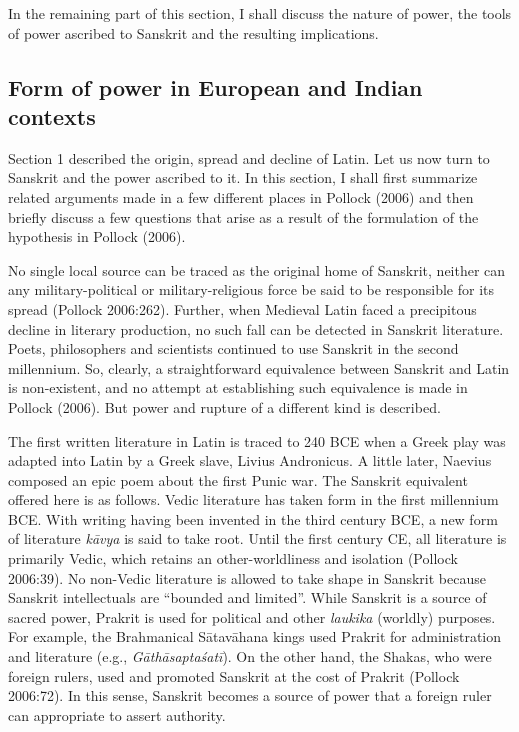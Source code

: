 In the remaining part of this section, I shall discuss the nature of power, the tools of power ascribed to Sanskrit and the resulting implications.
\newpage


\subsection{Form of power in European and Indian contexts}
\vskip -4pt

Section 1 described the origin, spread and decline of Latin. Let us now turn to Sanskrit and the power ascribed to it. In this section, I shall first summarize related arguments made in a few different places in Pollock (2006) and then briefly discuss a few questions that arise as a result of the formulation of the hypothesis in Pollock (2006). 

No single local source can be traced as the original home of Sanskrit, neither can any military-political or military-religious force be said to be responsible for its spread (Pollock 2006:262). Further, when Medieval Latin faced a precipitous decline in literary production, no such fall can be detected in Sanskrit literature. Poets, philosophers and scientists continued to use Sanskrit in the second millennium. So, clearly, a straightforward equivalence between Sanskrit and Latin is non-existent, and no attempt at establishing such equivalence is made in Pollock (2006). But power and rupture of a different kind is described.

The first written literature in Latin is traced to 240 BCE when a Greek play was adapted into Latin by a Greek slave, Livius Andronicus. A little later, Naevius composed an epic poem about the first Punic war. The Sanskrit equivalent offered here is as follows. Vedic literature has taken form in the first millennium BCE. With writing having been invented in the third century BCE, a new form of literature {\sl kāvya} is said to take root. Until the first century CE, all literature is primarily Vedic, which retains an other-worldliness and isolation (Pollock 2006:39). No non-Vedic literature is allowed to take shape in Sanskrit because Sanskrit intellectuals are “bounded and limited”. While Sanskrit is a source of sacred power, Prakrit is used for political and other {\sl laukika} (worldly) purposes. For example, the Brahmanical Sātavāhana kings used Prakrit for administration and literature (e.g., {\sl Gāthāsaptaśatī}). On the other hand, the Shakas, who were foreign rulers, used and promoted Sanskrit at the cost of Prakrit (Pollock 2006:72). In this sense, Sanskrit becomes a source of power that a foreign ruler can appropriate to assert authority.

